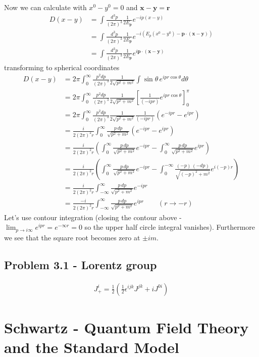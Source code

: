 \documentclass[10pt,a4paper]{book}
\theoremstyle{definition}
\begin{document}
Now we can calculate with $x^0-y^0=0$ and $\mathbf{x}-\mathbf{y}=\mathbf{r}$
\begin{align}
D(x-y)
&=\int\frac{d^3p}{(2\pi)^3}\frac{1}{2E_\mathbf{p}}e^{-ip(x-y)}\\
&=\int\frac{d^3p}{(2\pi)^3}\frac{1}{2E_\mathbf{p}}e^{-i(E_p(x^0-y^0)-\mathbf{p}\cdot(\mathbf{x}-\mathbf{y}))}\\
&=\int\frac{d^3p}{(2\pi)^3}\frac{1}{2E_\mathbf{p}}e^{i\mathbf{p}\cdot(\mathbf{x}-\mathbf{y})}
\end{align}
transforming to spherical coordinates
\begin{align}
D(x-y)
&=2\pi\int_0^\infty\frac{p^2dp}{(2\pi)^3}\frac{1}{2\sqrt{p^2+m^2}}\int\sin\theta \,e^{ipr\cos\theta}d\theta\\
&=2\pi\int_0^\infty\frac{p^2dp}{(2\pi)^3}\frac{1}{2\sqrt{p^2+m^2}}\left[\frac{1}{(-ipr)}e^{ipr\cos\theta}\right]_0^\pi\\
&=2\pi\int_0^\infty\frac{p^2dp}{(2\pi)^3}\frac{1}{2\sqrt{p^2+m^2}}\frac{1}{(-ipr)}(e^{-ipr}-e^{ipr})\\
&=\frac{i}{2(2\pi)^2r}\int_0^\infty\frac{p\,dp}{\sqrt{p^2+m^2}}(e^{-ipr}-e^{ipr})\\
&=\frac{i}{2(2\pi)^2r}\left(\int_0^\infty\frac{p\,dp}{\sqrt{p^2+m^2}}e^{-ipr}-\int_0^\infty\frac{p\,dp}{\sqrt{p^2+m^2}}e^{ipr}\right)\\
&=\frac{i}{2(2\pi)^2r}\left(\int_0^\infty\frac{p\,dp}{\sqrt{p^2+m^2}}e^{-ipr}-\int_0^{-\infty}\frac{(-p)\,(-dp)}{\sqrt{(-p)^2+m^2}}e^{i(-p)r}\right)\\
&=\frac{i}{2(2\pi)^2r}\int_{-\infty}^\infty\frac{p\,dp}{\sqrt{p^2+m^2}}e^{-ipr}\\
&=\frac{-i}{2(2\pi)^2r}\int_{-\infty}^\infty\frac{p\,dp}{\sqrt{p^2+m^2}}e^{ipr}\qquad (r\rightarrow-r)
\end{align}
Let's use contour integration (closing the contour above - $\lim_{p\rightarrow i\infty}e^{ipr}=e^{-\infty r}=0$ so the upper half circle integral vanishes). Furthermore we see that the square root becomes zero at $\pm im$. 


\subsection{Problem 3.1 - Lorentz group}
\begin{align}
J_+^i=\frac{1}{2}\left(\frac{1}{2}\epsilon^{ijk}J^{jk}+iJ^{0i}\right)
\end{align}




\section{{\sc Schwartz} - Quantum Field Theory and the Standard Model}
\end{document}
